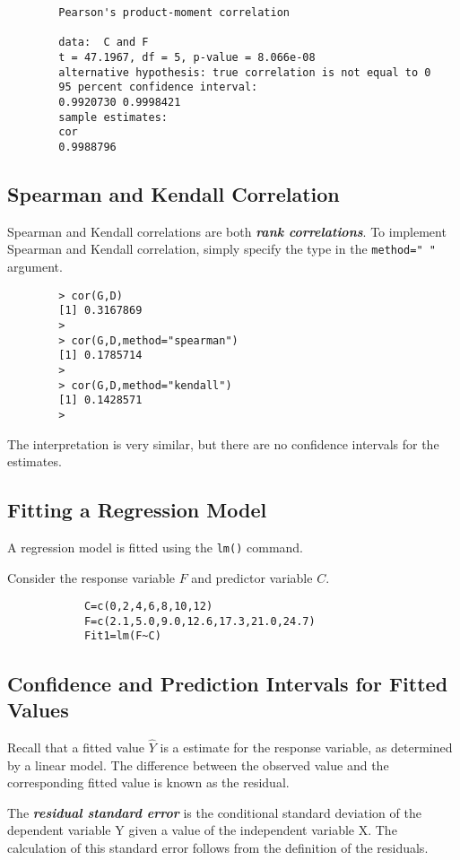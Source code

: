 \documentclass[a4paper,12pt]{article}
\begin{document}
\begin{itemize}
\begin{itemize}
\begin{verbatim}
		Pearson's product-moment correlation
		
		data:  C and F 
		t = 47.1967, df = 5, p-value = 8.066e-08
		alternative hypothesis: true correlation is not equal to 0 
		95 percent confidence interval:
		0.9920730 0.9998421 
		sample estimates:
		cor 
		0.9988796 
		\end{verbatim}
		
		
		\subsection{Spearman and Kendall Correlation}
		Spearman and Kendall correlations are both \textbf{\emph{rank correlations}}. 
		To implement Spearman and Kendall correlation, simply specify the type in the \texttt{method=" "} argument.
		\begin{verbatim}
		> cor(G,D)
		[1] 0.3167869
		>
		> cor(G,D,method="spearman")
		[1] 0.1785714
		>
		> cor(G,D,method="kendall")
		[1] 0.1428571
		> 
		\end{verbatim}
		The interpretation is very similar, but there are no confidence intervals for the estimates.
		
		\subsection{Fitting a Regression Model}
		A regression model is fitted using the \texttt{lm()} command.
		
		Consider the response variable $F$ and predictor variable $C$.
		\begin{framed}
			\begin{verbatim}
			C=c(0,2,4,6,8,10,12) 
			F=c(2.1,5.0,9.0,12.6,17.3,21.0,24.7)
			Fit1=lm(F~C)
			\end{verbatim}
		\end{framed}
		
		
		\subsection{Confidence and Prediction Intervals for Fitted Values} 
		
		Recall that a fitted value $\hat{Y}$ is a estimate for the response variable, as determined by a linear model. The difference between the observed value and the corresponding fitted value is known as the residual.
		
		The \textbf{\emph{residual standard error}} is the conditional standard deviation of the dependent variable Y given a value of the independent variable X. The calculation of this standard error follows from the definition of the residuals.
		

\end{itemize}
\end{itemize}
\end{document}
